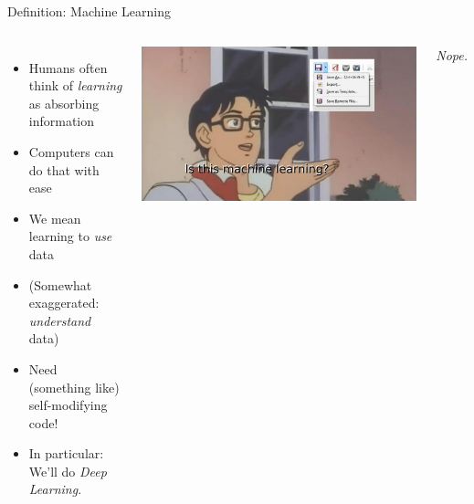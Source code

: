 \begin{frame}{Definition: Machine Learning}
%
\begin{columns}[T]
\begin{itemize}
\item Humans often think of \emph{learning} as absorbing information
\item Computers can do that with ease
\item We mean learning to \emph{use} data
\item (Somewhat exaggerated: \emph{understand} data)
\item[\Thus] Need (something like) self-modifying code!
\item In particular: We'll do \emph{Deep Learning}.
\end{itemize}
%
\includegraphics[width=\linewidth]{./gfx/ML-meme}
\begin{center}
	\small
	\emph{Nope.}
\end{center}
\end{columns}
%
\end{frame}


